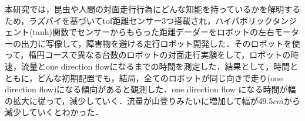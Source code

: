 本研究では，昆虫や人間の対面走行行為にどんな知能を持っているかを解明するため，ラズパイを基づいてtof距離センサー3つ搭載され，ハイパボリックタンジェント(tanh)関数でセンサーからもらった距離デーダーをロボットの左右モーターの出力に写像して，障害物を避ける走行ロボット開発した．そのロボットを使って，楕円コースで異なる台数のロボットの対面走行実験をして，ロボットの時速，流量とone direction flowになるまでの時間を測定した．結果として，時間とともに，どんな初期配置でも，結局，全てのロボットが同じ向きで走り(one direction flow)になる傾向があると観測した．one direction flow になる時間が幅の拡大に従って，減少していく．流量が山登りみたいに増加して幅が49.5$cm$から減少していくとわかった．
